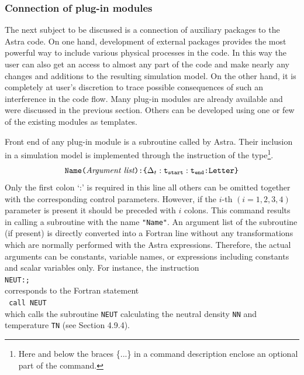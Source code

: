 \subsubsection{Connection of plug-in modules}

The next subject to be discussed is a connection of auxiliary
packages to the Astra code. 
On one hand, development of external packages provides the most
powerful way to include various physical processes in the code. 
In this way the user can also get an access to almost any part of the
code and make nearly any 
changes and additions to the resulting simulation model.
On the other hand, it is completely at user's discretion to trace
possible consequences of such an interference in the code flow.
Many plug-in modules are already available and were discussed in the
previous section.
Others can be developed using one or few of the existing modules as
templates. 

Front end of any plug-in module is a subroutine called by Astra.
Their inclusion in a simulation model is implemented through the
instruction of the type\footnote
{Here and below the braces \{...\} in a command description
enclose an optional part of the command.}.
\begin{equation}\label{sbr}
\mbox{\tt Name(\it Argument list}\mbox{\tt):\symbol{123}}\Delta_t
\tt:t_{start}\tt:t_{end}\mbox{\tt:Letter\symbol{125}}
\end{equation}
Only the first colon `:' is required in this line all others can be
omitted together with the corresponding control parameters.
However, if the $i\!$-th $(i=1,2,3,4)$ parameter is present it
should be preceded with $i$ colons.
This command results in calling a subroutine with the name {\tt "Name"}.
An argument list of the subroutine (if present) is directly converted
into a Fortran line without any transformations which are normally
performed with the Astra expressions. 
Therefore, the actual arguments can be constants, variable names, 
or expressions including constants and scalar variables only.
For instance, the instruction 
\\
{\tt\hspace*{3em}NEUT:;} 
\\
corresponds to the Fortran
statement\\ 
{\tt
\hspace*{3em}call~NEUT}\\
which calls the subroutine {\tt NEUT} calculating the neutral density 
{\tt NN} and temperature {\tt TN} (see Section 4.9.4).

